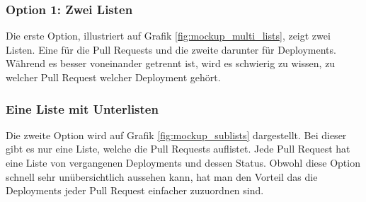 \begin{minipage}{\textwidth}
    \subsubsection{Option 1: Zwei Listen}
    Die erste Option, illustriert auf Grafik \ref{fig:mockup_multi_lists}, zeigt zwei Listen. Eine für die Pull Requests und
    die zweite darunter für Deployments. \newline
    Während es besser voneinander getrennt ist, wird es schwierig zu wissen, zu welcher Pull Request welcher Deployment
    gehört. \newline
\end{minipage}

\begin{minipage}{\textwidth}
    \subsubsection{Eine Liste mit Unterlisten}
    Die zweite Option wird auf Grafik \ref{fig:mockup_sublists} dargestellt. Bei dieser gibt es nur eine Liste, welche
    die Pull Requests auflistet. Jede Pull Request hat eine Liste von vergangenen Deployments und dessen Status. \newline
    Obwohl diese Option schnell sehr unübersichtlich aussehen kann, hat man den Vorteil das die Deployments jeder
    Pull Request einfacher zuzuordnen sind. \newline
\end{minipage}

